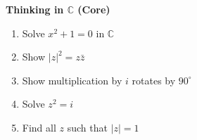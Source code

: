 \documentclass[11pt]{article}
\newcommand{\C}{\mathbb{C}}
\begin{document}
\begin{problembox}

\textbf{Thinking in $\C$ (Core)}

\begin{enumerate}

\item Solve $x^2 + 1 = 0$ in $\C$
\item Show $|z|^2 = z\bar{z}$
\item Show multiplication by $i$ rotates by $90^\circ$
\item Solve $z^2 = i$
\item Find all $z$ such that $|z| = 1$

\end{enumerate}

\end{problembox}
\end{document}
